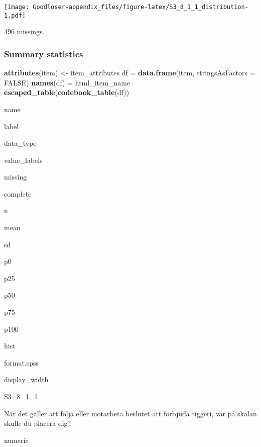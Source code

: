\documentclass[]{book}
\newenvironment{Shaded}{\begin{snugshade}}{\end{snugshade}}
\newcommand{\KeywordTok}[1]{\textcolor[rgb]{0.13,0.29,0.53}{\textbf{#1}}}
\newcommand{\DataTypeTok}[1]{\textcolor[rgb]{0.13,0.29,0.53}{#1}}
\newcommand{\StringTok}[1]{\textcolor[rgb]{0.31,0.60,0.02}{#1}}
\newcommand{\OtherTok}[1]{\textcolor[rgb]{0.56,0.35,0.01}{#1}}
\newcommand{\OperatorTok}[1]{\textcolor[rgb]{0.81,0.36,0.00}{\textbf{#1}}}
\newcommand{\NormalTok}[1]{#1}
\begin{document}
\texttt{[image: Goodloser-appendix\_files/figure-latex/S3\_8\_1\_1\_distribution-1.pdf]}

\begin{Shaded}
\end{Shaded}

496 missings.

\subsubsection{Summary statistics}\label{S3_8_1_1_summary}

\begin{Shaded}
\begin{Highlighting}[]
\KeywordTok{attributes}\NormalTok{(item) <-}\StringTok{ }\NormalTok{item_attributes}
\NormalTok{df =}\StringTok{ }\KeywordTok{data.frame}\NormalTok{(item, }\DataTypeTok{stringsAsFactors =} \OtherTok{FALSE}\NormalTok{)}
\KeywordTok{names}\NormalTok{(df) =}\StringTok{ }\NormalTok{html_item_name}
\KeywordTok{escaped_table}\NormalTok{(}\KeywordTok{codebook_table}\NormalTok{(df))}
\end{Highlighting}
\end{Shaded}

name

label

data\_type

value\_labels

missing

complete

n

mean

sd

p0

p25

p50

p75

p100

hist

format.spss

display\_width

S3\_8\_1\_1

När det gäller att följa eller motarbeta beslutet att förbjuda tiggeri,
var på skalan skulle du placera dig?

numeric
\end{document}
